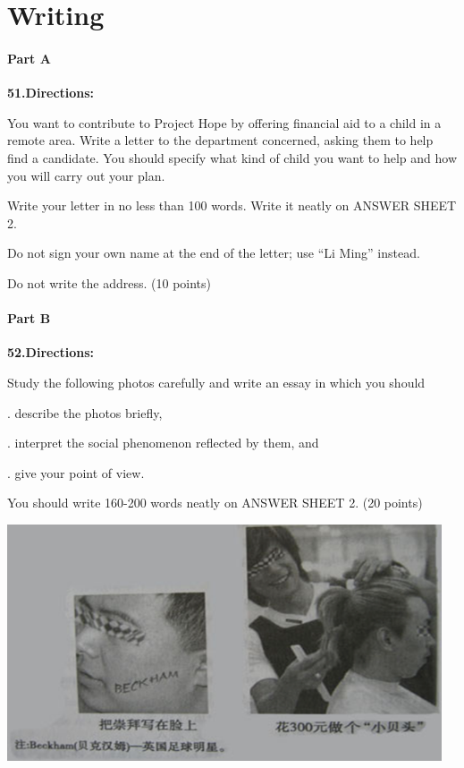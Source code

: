 \section{Writing}
\paragraph{Part A}

\textbf{51.Directions:}

\qquad You want to contribute to Project Hope by offering financial aid to a child in a remote area. Write a letter to the department concerned, asking them to help find a candidate. You should specify what kind of child you want to help and how you will carry out your plan.

\qquad Write your letter in no less than 100 words. Write it neatly on ANSWER SHEET 2.

\qquad Do not sign your own name at the end of the letter; use “Li Ming” instead.

\qquad Do not write the address. (10 points)

\paragraph{Part B}

\textbf{52.Directions:}

\qquad Study the following photos carefully and write an essay in which you should

. describe the photos briefly,

. interpret the social phenomenon reflected by them, and

. give your point of view.

\qquad You should write 160-200 words neatly on ANSWER SHEET 2. (20 points)

\begin{center}\includegraphics[height=7cm]{8.png}\end{center}